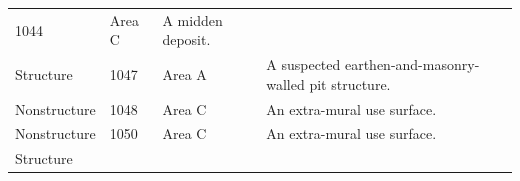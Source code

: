 \documentclass[
  12pt,
]{krantz}
\begin{document}
\begin{longtable}[]{@{}llll@{}}
\begin{minipage}[t]{0.11\columnwidth}
1044\strut
\end{minipage} & \begin{minipage}[t]{0.16\columnwidth}\raggedright
Area C\strut
\end{minipage} & \begin{minipage}[t]{0.38\columnwidth}\raggedright
A midden deposit.\strut
\end{minipage}\tabularnewline
\begin{minipage}[t]{0.18\columnwidth}\raggedright
Structure\strut
\end{minipage} & \begin{minipage}[t]{0.11\columnwidth}\raggedright
1047\strut
\end{minipage} & \begin{minipage}[t]{0.16\columnwidth}\raggedright
Area A\strut
\end{minipage} & \begin{minipage}[t]{0.38\columnwidth}\raggedright
A suspected
earthen-and-masonry-walled
pit structure.\strut
\end{minipage}\tabularnewline
\begin{minipage}[t]{0.18\columnwidth}\raggedright
Nonstructure\strut
\end{minipage} & \begin{minipage}[t]{0.11\columnwidth}\raggedright
1048\strut
\end{minipage} & \begin{minipage}[t]{0.16\columnwidth}\raggedright
Area C\strut
\end{minipage} & \begin{minipage}[t]{0.38\columnwidth}\raggedright
An extra-mural use surface.\strut
\end{minipage}\tabularnewline
\begin{minipage}[t]{0.18\columnwidth}\raggedright
Nonstructure\strut
\end{minipage} & \begin{minipage}[t]{0.11\columnwidth}\raggedright
1050\strut
\end{minipage} & \begin{minipage}[t]{0.16\columnwidth}\raggedright
Area C\strut
\end{minipage} & \begin{minipage}[t]{0.38\columnwidth}\raggedright
An extra-mural use surface.\strut
\end{minipage}\tabularnewline
\begin{minipage}[t]{0.18\columnwidth}\raggedright
Structure\strut
\end{minipage} & \begin{minipage}[t]{0.11\columnwidth}\raggedright

\end{minipage}
\end{longtable}
\end{document}
